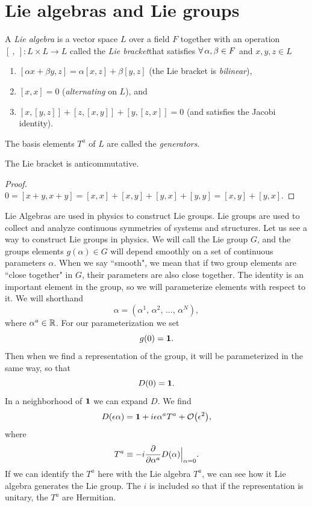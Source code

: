 \section{Lie algebras and Lie groups}

  A {\it Lie algebra} is a vector space $L$ over a field $F$
  together with an operation $[\ ,\ ]:L\times L\to L$ called the 
  {\it Lie bracket}that satisfies 
  $\operatorname{\forall} \alpha,\beta\in F$ 
  and $x,y,z\in L$
  \begin{enumerate}
    \item $[\alpha x+\beta y,z]=\alpha[x,z]+\beta[y,z]$ (the Lie bracket is 
          {\it bilinear}),
    \item $[x,x]=0$ ({\it alternating} on $L$), and
    \item $[x,[y,z]]+[z,[x,y]]+[y,[z,x]]=0$ (and satisfies the Jacobi
          identity).
  \end{enumerate}
  The basis elements $T^a$ of $L$ are called the {\it generators}.

\begin{proposition}{}{}
  The Lie bracket is anticommutative.
  \begin{proof}
    $0=[x+y,x+y]=[x,x]+[x,y]+[y,x]+[y,y]=[x,y]+[y,x].$
  \end{proof}
\end{proposition}

Lie Algebras are used in physics to construct Lie groups.
Lie groups
are used to collect and analyze continuous symmetries of systems
and structures.
Let us see a way to construct Lie groups in physics. We will call the 
Lie group $G$, and the groups elements $g(\alpha)\in G$ will depend
smoothly on a set of continuous parameters $\alpha$. When we say ``smooth", we
mean that if two group elements are ``close together" in $G$, their parameters
are also close together. The identity is an important element in the group, so
we will parameterize elements with respect to it. We will shorthand
\begin{equation}
  \alpha=\left(\alpha^1,\,\alpha^2,\,...,\,\alpha^N\right),
\end{equation}
where $\alpha^a\in\mathbb{R}$. For our parameterization we set
\begin{equation}
  g(0)={\mathbf 1}.
\end{equation}
Then when we find a representation of the group, it will be
parameterized in the same way, so that
\begin{equation}
  D(0)={\mathbf 1}.
\end{equation}
In a neighborhood of ${\mathbf 1}$ we can expand $D$. We find
\begin{equation}\label{eq:Depsilon}
  D(\epsilon\alpha)=\id+i\epsilon\alpha^aT^a+\order{\epsilon^2},
\end{equation}
where
\begin{equation}
  T^a\equiv-i\pdv{\alpha^a}D(\alpha)\Big|_{\alpha=0}.
\end{equation}
If we can identify the $T^a$ here with the Lie algebra $T^a$, we can see
how it Lie algebra generates the Lie group. The $i$ is included so that
if the representation is unitary, the $T^a$ are Hermitian.

